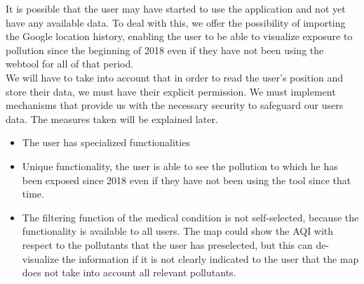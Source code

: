 It is possible that the user may have started to use the application and not yet have any available data.
To deal with this, we offer the possibility of importing the Google location history, enabling the user to be able to visualize
exposure to pollution since the beginning of 2018 even if they have not been using the webtool for  all of that period.\\

We will have to take into account that in order to read the user's position and store their data, we must
have their explicit permission. We must implement mechanisms that provide us with the necessary security to safeguard our users data. The measures taken will be explained later.

\begin{itemize}
  \item The user has specialized functionalities
  \item Unique functionality, the user is able to see the pollution to which he has been exposed since 2018 even if they have not been using the tool since that time.
  \item The filtering function of the medical condition is not self-selected, because the functionality
        is available to all users. The map could show the AQI with respect to the
        pollutants that the user has preselected, but this can de-visualize the information if it is not
        clearly indicated to the user that the map does not take into account all relevant pollutants.
\end{itemize}
